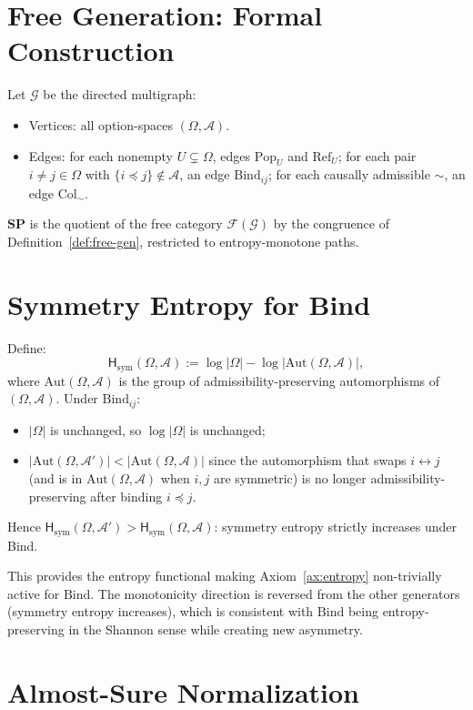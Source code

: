 \documentclass[12pt,a4paper]{article}
\theoremstyle{definition}
\theoremstyle{remark}
\newcommand{\SP}{\mathbf{SP}}
\newcommand{\Pop}{\mathrm{Pop}}
\newcommand{\Ref}{\mathrm{Ref}}
\newcommand{\Bind}{\mathrm{Bind}}
\newcommand{\Col}{\mathrm{Col}}
\begin{document}
\section{Free Generation: Formal Construction}
\label{app:free}

Let $\mathcal{G}$ be the directed multigraph:
\begin{itemize}
\item Vertices: all option-spaces $(\Omega,\mathcal{A})$.
\item Edges: for each nonempty $U\subsetneq\Omega$, edges $\Pop_U$ and $\Ref_U$;
  for each pair $i\ne j\in\Omega$ with $\{i\preceq j\}\notin\mathcal{A}$, an edge
  $\Bind_{ij}$; for each causally admissible $\sim$, an edge $\Col_\sim$.
\end{itemize}
$\SP$ is the quotient of the free category $\mathcal{F}(\mathcal{G})$ by the
congruence of Definition~\ref{def:free-gen}, restricted to entropy-monotone paths.

\section{Symmetry Entropy for Bind}
\label{app:symm-entropy}

Define:
\[
  \mathsf{H}_{\mathrm{sym}}(\Omega,\mathcal{A})
  := \log|\Omega| - \log|\mathrm{Aut}(\Omega,\mathcal{A})|,
\]
where $\mathrm{Aut}(\Omega,\mathcal{A})$ is the group of admissibility-preserving
automorphisms of $(\Omega,\mathcal{A})$. Under $\Bind_{ij}$:
\begin{itemize}
\item $|\Omega|$ is unchanged, so $\log|\Omega|$ is unchanged;
\item $|\mathrm{Aut}(\Omega,\mathcal{A}')|<|\mathrm{Aut}(\Omega,\mathcal{A})|$ since
  the automorphism that swaps $i\leftrightarrow j$ (and is in $\mathrm{Aut}(\Omega,
  \mathcal{A})$ when $i,j$ are symmetric) is no longer admissibility-preserving after
  binding $i\preceq j$.
\end{itemize}
Hence $\mathsf{H}_{\mathrm{sym}}(\Omega,\mathcal{A}')>\mathsf{H}_{\mathrm{sym}}(\Omega,
\mathcal{A})$: symmetry entropy strictly increases under Bind.

This provides the entropy functional making Axiom~\ref{ax:entropy} non-trivially
active for $\Bind$. The monotonicity direction is reversed from the other generators
(symmetry entropy increases), which is consistent with $\Bind$ being entropy-preserving
in the Shannon sense while creating new asymmetry.

\section{Almost-Sure Normalization}
\label{app:asnorm}
\end{document}
